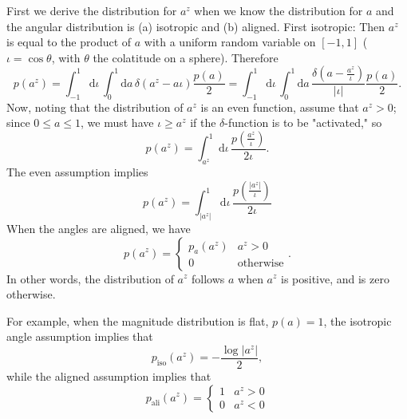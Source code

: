 \documentclass[modern]{aastex61}
\newcommand{\dd}{\mathrm{d}}
\newcommand{\pali}{p_\mathrm{ali}}
\newcommand{\piso}{p_\mathrm{iso}}
\begin{document}
First we derive the distribution for $a^z$ when we know the
distribution for $a$ and the angular distribution is (a) isotropic and
(b) aligned.  First isotropic: Then $a^z$ is equal to the product of
$a$ with a uniform random variable on $[-1,1]$ ($\iota = \cos \theta$,
with $\theta$ the colatitude on a sphere).  Therefore
\begin{equation}
  p\left( a^z \right) = \int_{-1}^{1} \dd \iota \, \int_0^1 \dd a \, \delta\left( a^z - a \iota \right) \frac{p(a)}{2} = \int_{-1}^{1} \dd \iota \, \int_0^1 \dd a \, \frac{\delta\left( a - \frac{a^z}{\iota} \right)}{\left| \iota \right|} \frac{p(a)}{2}.
\end{equation}
Now, noting that the distribution of $a^z$ is an even function, assume
that $a^z > 0$; since $0 \leq a \leq 1$, we must have $\iota \geq a^z$
if the $\delta$-function is to be "activated," so
\begin{equation}
p\left( a^z \right) = \int_{a^z}^1 \dd \iota \, \frac{p\left( \frac{a^z}{\iota} \right)}{2 \iota}.
\end{equation}
The even assumption implies 
\begin{equation}
p\left( a^z \right) = \int_{\left| a^z \right|}^1 \dd \iota \,
\frac{p\left( \frac{\left|a^z\right|}{\iota} \right)}{2 \iota}
\end{equation}
When the angles are aligned, we have
\begin{equation}
p\left( a^z \right) = \begin{cases}
p_a\left(a^z \right) & a^z > 0\\
0 & \mathrm{otherwise}
\end{cases}.
\end{equation}
In other words, the distribution of $a^z$ follows $a$ when $a^z$ is
positive, and is zero otherwise.

For example, when the magnitude distribution is flat, $p(a) = 1$, the
isotropic angle assumption implies that
\begin{equation}
\piso\left( a^z \right) = -\frac{\log \left| a^z \right|}{2},
\end{equation}
while the aligned assumption implies that
\begin{equation}
\pali\left( a^z \right) = \begin{cases}
1 & a^z > 0 \\
0 & a^z < 0
\end{cases}
\end{equation}
\end{document}

